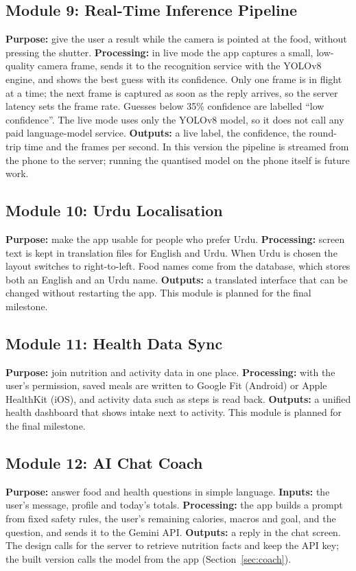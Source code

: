\subsection{Module 9: Real-Time Inference Pipeline}
\textbf{Purpose:} give the user a result while the camera is pointed at the food, without pressing the
shutter. \textbf{Processing:} in live mode the app captures a small, low-quality camera frame, sends it
to the recognition service with the YOLOv8 engine, and shows the best guess with its confidence. Only one
frame is in flight at a time; the next frame is captured as soon as the reply arrives, so the server
latency sets the frame rate. Guesses below 35\% confidence are labelled ``low confidence''. The live mode
uses only the YOLOv8 model, so it does not call any paid language-model service. \textbf{Outputs:} a live
label, the confidence, the round-trip time and the frames per second. In this version the pipeline is
streamed from the phone to the server; running the quantised model on the phone itself is future work.

\subsection{Module 10: Urdu Localisation}
\textbf{Purpose:} make the app usable for people who prefer Urdu. \textbf{Processing:} screen text is
kept in translation files for English and Urdu. When Urdu is chosen the layout switches to right-to-left.
Food names come from the database, which stores both an English and an Urdu name.
\textbf{Outputs:} a translated interface that can be changed without restarting the app.
This module is planned for the final milestone.

\subsection{Module 11: Health Data Sync}
\textbf{Purpose:} join nutrition and activity data in one place. \textbf{Processing:} with the user's
permission, saved meals are written to Google Fit (Android) or Apple HealthKit (iOS), and activity data
such as steps is read back. \textbf{Outputs:} a unified health dashboard that shows intake next to
activity. This module is planned for the final milestone.

\subsection{Module 12: AI Chat Coach}
\textbf{Purpose:} answer food and health questions in simple language. \textbf{Inputs:} the user's
message, profile and today's totals. \textbf{Processing:} the app builds a prompt from fixed safety rules,
the user's remaining calories, macros and goal, and the question, and sends it to the Gemini API.
\textbf{Outputs:} a reply in the chat screen. The design calls for the server to retrieve nutrition facts
and keep the API key; the built version calls the model from the app (Section~\ref{sec:coach}).

